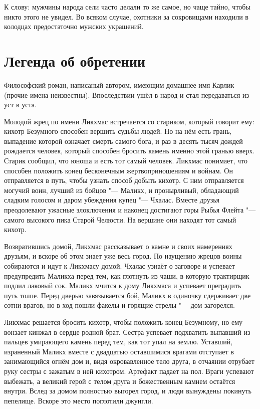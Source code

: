 К слову: мужчины народа сели часто делали то же самое, но чаще тайно, чтобы никто этого не увидел.
Во всяком случае, охотники за сокровищами находили в колодцах предостаточно мужских украшений.

\section{Легенда об обретении}

Философский роман, написаный автором, имеющим домашнее имя Карлик (прочие имена неизвестны).
Впоследствии ушёл в народ и стал передаваться из уст в уста.

Молодой жрец по имени Ликхмас встречается со стариком, который говорит ему: кихотр Безумного способен вершить судьбы людей.
Но на нём есть грань, выпадение которой означает смерть самого бога, и раз в десять тысяч дождей рождается человек, который способен бросить камень именно этой гранью вверх.
Старик сообщил, что юноша и есть тот самый человек.
Ликхмас понимает, что способен положить конец бесконечным жертвоприношениям и войнам.
Он отправляется в путь, чтобы узнать способ добыть кихотр.
С ним отправляется могучий воин, лучший из бойцов "--- Маликх, и пронырливый, обладающий сладким голосом и даром убеждения купец "--- Чхалас.
Вместе друзья преодолевают ужасные злоключения и наконец достигают горы Рыбья Флейта "--- самого высокого пика Старой Челюсти.
На вершине они находят тот самый кихотр.

Возвратившись домой, Ликхмас рассказывает о камне и своих намерениях друзьям, и вскоре об этом знает уже весь город.
По наущению жрецов воины собираются и идут к Ликхмасу домой.
Чхалас узнаёт о заговоре и успевает предупредить Маликха перед тем, как глотнуть из чаши, в которую трактирщик подлил лаковый сок.
Маликх мчится к дому Ликхмаса и успевает преградить путь толпе.
Перед дверью завязывается бой, Маликх в одиночку сдерживает две сотни врагов, но в ход пошли факелы и горящие стрелы "--- дом загорелся.

Ликхмас решается бросить кихотр, чтобы положить конец Безумному, но ему вонзает кинжал в сердце родной брат.
Сестра успевает подхватить выпавший из пальцев умирающего камень перед тем, как тот упал на землю.
Уставший, израненный Маликх вместе с двадцатью оставшимися врагами отступает в занимающийся огнём дом и, видя окровавленное тело друга, в отчаянии отрубает руку сестры с зажатым в ней кихотром.
Артефакт падает на пол.
Враги успевают выбежать, а великий герой с телом друга и божественным камнем остаётся внутри.
Вслед за домом полностью выгорел город, и люди вынуждены покинуть пепелище\footnotemark.
Вскоре это место поглотили джунгли.


